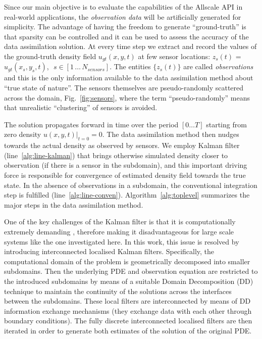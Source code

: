 \documentclass[acmsmall,review,anonymous]{acmart}\settopmatter{printfolios=true,printccs=false,printacmref=false}
\begin{document}
Since our main objective is to evaluate the capabilities of the Allscale API in real-world applications, the \textit{observation data} will be artificially generated for simplicity. The advantage of having the freedom to generate ``ground-truth'' is that sparsity can be controlled and it can be used to assess the accuracy of the data assimilation solution.  At every time step we extract and record the values of the ground-truth density field $u_{gt}(x,y,t)$ at few sensor locations: $z_s(t)$ = $u_{gt}(x_s,y_s,t)$, $\,\,s \in [1\,{\ldots}\,N_{sensors}]$. The entities $\{z_s(t)\}$ are called \textit{observations} and this is the only information available to the data assimilation method about ``true state of nature''. The sensors themselves are pseudo-randomly scattered across the domain, Fig.~\ref{fig:sensors}, where the term ``pseudo-randomly'' means that unrealistic ``clustering'' of sensors is avoided. 

The solution propagates forward in time over the period $[0 \ldots T]$ starting from zero density $u(x,y,t)\rvert_{t=0} = 0$. The data assimilation method then nudges towards the actual density as observed by sensors. We employ Kalman filter (line~\ref{alg:line-kalman}) that brings otherwise simulated density closer to observation (if there is a sensor in the subdomain), and this important driving force is responsible for convergence of estimated density field towards the true state. In the absence of observations in a subdomain, the conventional integration step is fulfilled (line~\ref{alg:line-conven}).  Algorithm~\ref{alg:toplevel} summarizes the major steps in the data assimilation method.

One of the key challenges of the Kalman filter is that it is computationally extremely demanding  \cite{verhaegen1986numerical}, therefore  making it disadvantageous for large scale systems like the one investigated here.
In this work, this issue is resolved by introducing interconnected localised Kalman filters. Specifically, the computational domain of the problem is geometrically decomposed into smaller subdomains. Then the underlying PDE and observation equation are restricted to the introduced subdomains by means of a suitable Domain Decomposition (DD) technique to maintain the continuity of the solutions across the interfaces between the subdomains. These local filters are interconnected by means of DD information exchange mechanisms (they exchange data with each other through boundary conditions). The fully discrete interconnected localised filters are then iterated in order to generate both estimates of the solution of the original PDE.
\end{document}
